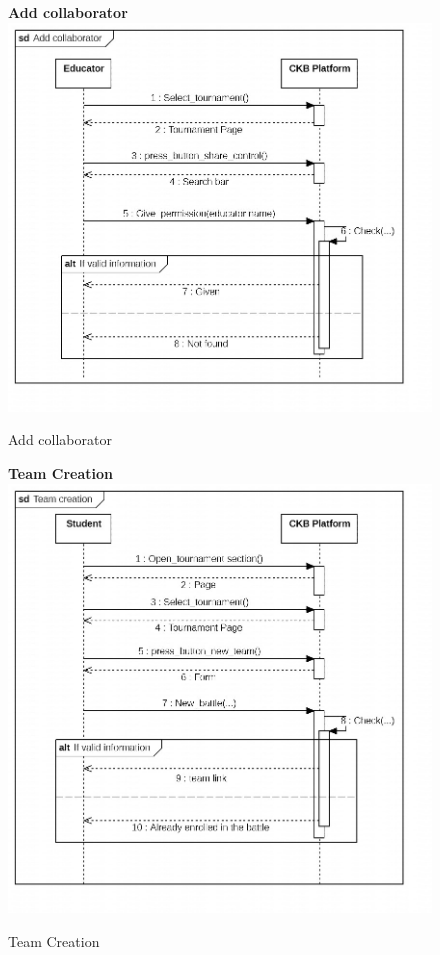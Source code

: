 \begin{enumerate}[label=\textbf{[UC\arabic*]}]
    \begin{figure}
    \item \textbf{Add collaborator}
        \centering
        \includegraphics[width= \textwidth]{Images/Add collaborator.jpg}
        \caption{Add collaborator}
        \label{fig:enter-label}
    \end{figure}
    
    
    \begin{figure}
    \item \textbf{Team Creation}
        \centering
        \includegraphics[width= \textwidth]{Images/Team creation.jpg}
        \caption{Team Creation}
        \label{fig:enter-label}
    \end{figure}
    

\end{enumerate}
